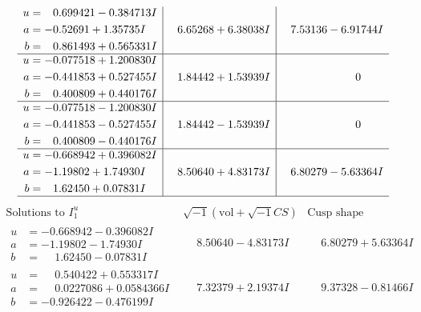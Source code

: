 \documentclass[1p]{elsarticle_modified}
\theoremstyle{definition}
\newcommand{\I}{\sqrt{-1}}
\begin{document}
$$\begin{array}{c|c|c}
\begin{aligned}
u &= \phantom{-}0.699421 - 0.384713 I \\
a &= -0.52691 + 1.35735 I \\
b &= \phantom{-}0.861493 + 0.565331 I\end{aligned}
 & \phantom{-}6.65268 + 6.38038 I & \phantom{-}7.53136 - 6.91744 I \\ \hline\begin{aligned}
u &= -0.077518 + 1.200830 I \\
a &= -0.441853 + 0.527455 I \\
b &= \phantom{-}0.400809 + 0.440176 I\end{aligned}
 & \phantom{-}1.84442 + 1.53939 I & \phantom{-0.000000 } 0 \\ \hline\begin{aligned}
u &= -0.077518 - 1.200830 I \\
a &= -0.441853 - 0.527455 I \\
b &= \phantom{-}0.400809 - 0.440176 I\end{aligned}
 & \phantom{-}1.84442 - 1.53939 I & \phantom{-0.000000 } 0 \\ \hline\begin{aligned}
u &= -0.668942 + 0.396082 I \\
a &= -1.19802 + 1.74930 I \\
b &= \phantom{-}1.62450 + 0.07831 I\end{aligned}
 & \phantom{-}8.50640 + 4.83173 I & \phantom{-}6.80279 - 5.63364 I\\
 \hline 
 \end{array}$$\newpage$$\begin{array}{c|c|c}  
\text{Solutions to }I^u_{1}& \I (\text{vol} + \sqrt{-1}CS) & \text{Cusp shape}\\
 \hline 
\begin{aligned}
u &= -0.668942 - 0.396082 I \\
a &= -1.19802 - 1.74930 I \\
b &= \phantom{-}1.62450 - 0.07831 I\end{aligned}
 & \phantom{-}8.50640 - 4.83173 I & \phantom{-}6.80279 + 5.63364 I \\ \hline\begin{aligned}
u &= \phantom{-}0.540422 + 0.553317 I \\
a &= \phantom{-}0.0227086 + 0.0584366 I \\
b &= -0.926422 - 0.476199 I\end{aligned}
 & \phantom{-}7.32379 + 2.19374 I & \phantom{-}9.37328 - 0.81466 I \\ \hline\begin{aligned}

\end{aligned}
\end{array}$$
\end{document}
